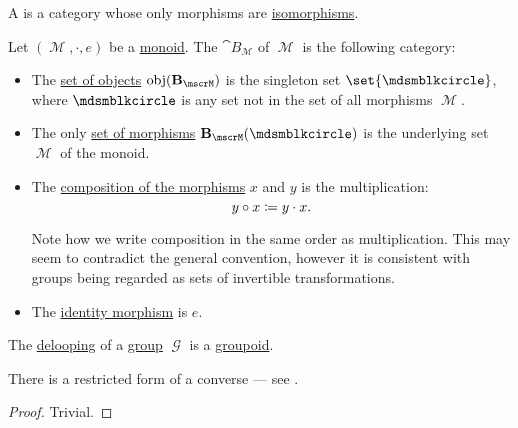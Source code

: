 \begin{definition}\label{def:groupoid}
  A  is a category whose only morphisms are \hyperref[def:morphism_invertibility/isomorphism]{isomorphisms}.
\end{definition}

\begin{definition}\label{def:monoid_delooping}
  Let \( (\mscrM, \cdot, e) \) be a \hyperref[def:unital_magma/monoid]{monoid}. The  \( \cat{B}_\mscrM \) of \( \mscrM \) is the following category:
  \begin{itemize}
    \item The \hyperref[def:category/objects]{set of objects} \( \obj(\cat{B}_\mscrM) \) is the singleton set \( \set{ \Anon } \), where \( \Anon \) is any set not in the set of all morphisms \( \mscrM \).

    \item The only \hyperref[def:category/morphisms]{set of morphisms} \( \cat{B}_\mscrM(\Anon) \) is the underlying set \( \mscrM \) of the monoid.

    \item The \hyperref[def:category/composition]{composition of the morphisms} \( x \) and \( y \) is the multiplication:
    \begin{equation*}
      y \bincirc x \coloneqq y \cdot x.
    \end{equation*}

    Note how we write composition in the same order as multiplication. This may seem to contradict the general convention, however it is consistent with groups being regarded as sets of invertible transformations.

    \item The \hyperref[def:category/identity]{identity morphism} is \( e \).
  \end{itemize}
\end{definition}

\begin{proposition}\label{thm:delooping_of_group}
  The \hyperref[def:monoid_delooping]{delooping} of a \hyperref[def:group]{group} \( \mscrG \) is a \hyperref[def:groupoid]{groupoid}.

  There is a restricted form of a converse --- see .
\end{proposition}
\begin{proof}
  Trivial.
\end{proof}

